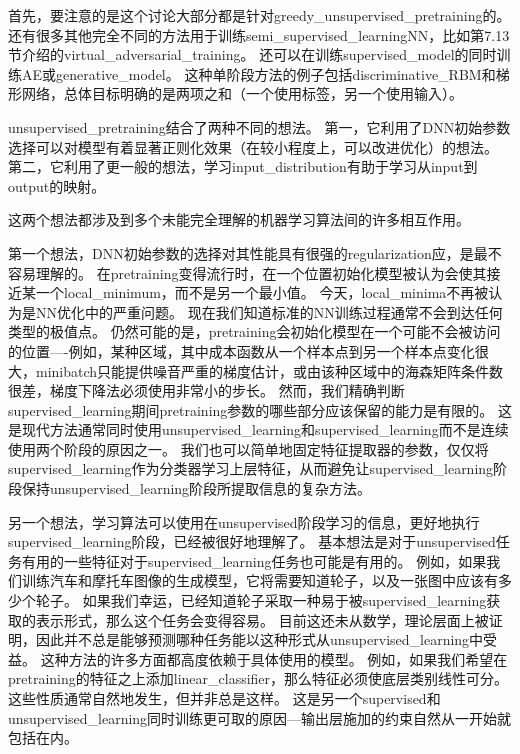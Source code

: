 
首先，要注意的是这个讨论大部分都是针对\gls{greedy_unsupervised_pretraining}的。
还有很多其他完全不同的方法用于训练\gls{semi_supervised_learning}\gls{NN}，比如第7.13节介绍的\gls{virtual_adversarial_training}。
还可以在训练\gls{supervised_model}的同时训练\gls{AE}或\gls{generative_model}。
这种单阶段方法的例子包括\gls{discriminative_RBM}\citep{Larochelle+Bengio-2008}和梯形网络\citep{Rasmus-et-al-arxiv2015}，总体目标明确的是两项之和（一个使用标签，另一个使用输入）。


\gls{unsupervised_pretraining}结合了两种不同的想法。
第一，它利用了\gls{DNN}初始参数选择可以对模型有着显著正则化效果（在较小程度上，可以改进优化）的想法。
第二，它利用了更一般的想法，学习\gls{input_distribution}有助于学习从\gls{input}到\gls{output}的映射。


这两个想法都涉及到多个未能完全理解的机器学习算法间的许多相互作用。


第一个想法，\gls{DNN}初始参数的选择对其性能具有很强的\gls{regularization}应，是最不容易理解的。
在\gls{pretraining}变得流行时，在一个位置初始化模型被认为会使其接近某一个\gls{local_minimum}，而不是另一个最小值。
今天，\gls{local_minima}不再被认为是\gls{NN}优化中的严重问题。
现在我们知道标准的\gls{NN}训练过程通常不会到达任何类型的极值点。
仍然可能的是，\gls{pretraining}会初始化模型在一个可能不会被访问的位置----例如，某种区域，其中成本函数从一个样本点到另一个样本点变化很大，\gls{minibatch}只能提供噪音严重的梯度估计，或由该种区域中的海森矩阵条件数很差，梯度下降法必须使用非常小的步长。
然而，我们精确判断\gls{supervised_learning}期间\gls{pretraining}参数的哪些部分应该保留的能力是有限的。
这是现代方法通常同时使用\gls{unsupervised_learning}和\gls{supervised_learning}而不是连续使用两个阶段的原因之一。
我们也可以简单地固定特征提取器的参数，仅仅将\gls{supervised_learning}作为分类器学习上层特征，从而避免让\gls{supervised_learning}阶段保持\gls{unsupervised_learning}阶段所提取信息的复杂方法。


另一个想法，学习算法可以使用在\gls{unsupervised}阶段学习的信息，更好地执行\gls{supervised_learning}阶段，已经被很好地理解了。
基本想法是对于\gls{unsupervised}任务有用的一些特征对于\gls{supervised_learning}任务也可能是有用的。
例如，如果我们训练汽车和摩托车图像的生成模型，它将需要知道轮子，以及一张图中应该有多少个轮子。
如果我们幸运，已经知道轮子采取一种易于被\gls{supervised_learning}获取的表示形式，那么这个任务会变得容易。
目前这还未从数学，理论层面上被证明，因此并不总是能够预测哪种任务能以这种形式从\gls{unsupervised_learning}中受益。
这种方法的许多方面都高度依赖于具体使用的模型。
例如，如果我们希望在\gls{pretraining}的特征之上添加\gls{linear_classifier}，那么特征必须使底层类别线性可分。
这些性质通常自然地发生，但并非总是这样。
这是另一个\gls{supervised}和\gls{unsupervised_learning}同时训练更可取的原因---输出层施加的约束自然从一开始就包括在内。

